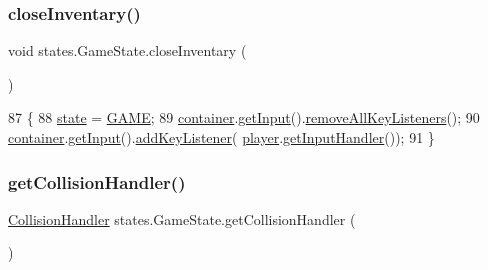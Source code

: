 \subsubsection{\texorpdfstring{close\+Inventary()}{closeInventary()}}
{\footnotesize\ttfamily void states.\+Game\+State.\+close\+Inventary (\begin{DoxyParamCaption}{ }\end{DoxyParamCaption})\hspace{0.3cm}{\ttfamily [inline]}}


\begin{DoxyCode}
87                                  \{
88         \mbox{\hyperlink{classstates_1_1_game_state_a5e07b1776e13d009e1a8c6a1e8140d04}{state}} = \mbox{\hyperlink{classstates_1_1_game_state_a8617f1d8be7bed020eeab9384e731bc6}{GAME}};
89         \mbox{\hyperlink{classstates_1_1_game_state_a88b0df4b57ada742c53e4e1ee3b25827}{container}}.\mbox{\hyperlink{classorg_1_1newdawn_1_1slick_1_1_game_container_a6042fd06c54872f9f791bd33beffec88}{getInput}}().\mbox{\hyperlink{classorg_1_1newdawn_1_1slick_1_1_input_ae9aa4789e13f1528ae603939684a4237}{removeAllKeyListeners}}();
90         \mbox{\hyperlink{classstates_1_1_game_state_a88b0df4b57ada742c53e4e1ee3b25827}{container}}.\mbox{\hyperlink{classorg_1_1newdawn_1_1slick_1_1_game_container_a6042fd06c54872f9f791bd33beffec88}{getInput}}().\mbox{\hyperlink{classorg_1_1newdawn_1_1slick_1_1_input_af5ad91bb375e8834e1914f441794561b}{addKeyListener}}(
      \mbox{\hyperlink{classstates_1_1_game_state_ae8ec891c55e1c5d43372a289d8a6d87e}{player}}.\mbox{\hyperlink{classentities_1_1_player_afddc465ed5f94a8137b90790e815ecea}{getInputHandler}}());
91     \}
\end{DoxyCode}
\mbox{\label{classstates_1_1_game_state_af774083d4669d438a4c9248859f64c08}} 
\subsubsection{\texorpdfstring{get\+Collision\+Handler()}{getCollisionHandler()}}
{\footnotesize\ttfamily \mbox{\hyperlink{classentities_1_1_collision_handler}{Collision\+Handler}} states.\+Game\+State.\+get\+Collision\+Handler (\begin{DoxyParamCaption}{ }\end{DoxyParamCaption})\hspace{0.3cm}{\ttfamily [inline]}}


